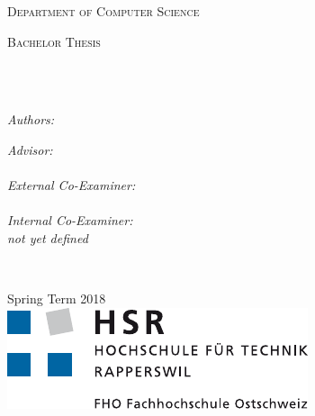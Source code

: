 \begin{titlepage}
\begin{center}

\vspace*{.06\textheight}
{\scshape\LARGE \univname\par} %

{\scshape\large Department of Computer Science\par}\vspace{1.2cm} %
\textsc{\Large Bachelor Thesis}\\[0.5cm] %

\HRule \\[0.4cm] %
{\huge \bfseries \ttitle\par}\vspace{0.4cm} %
\HRule \\[1.5cm] %
 
\begin{minipage}[t]{0.4\textwidth}
\begin{flushleft} \large
\emph{Authors:}\\
\authorname %
\end{flushleft}
\end{minipage}
\begin{minipage}[t]{0.4\textwidth}
\begin{flushright} \large
\emph{Advisor:} \\
\supname \\[1cm]
\emph{External Co-Examiner:} \\
\examname \\[1cm]
\emph{Internal Co-Examiner:} \\
\textit{not yet defined} \\[1cm]
\end{flushright}
\end{minipage}\\[3cm]
 
\vfill

{\large Spring Term 2018}\\[4cm] %
\includegraphics{resources/logo_hsr} %
 
\vfill
\end{center}
\end{titlepage}

